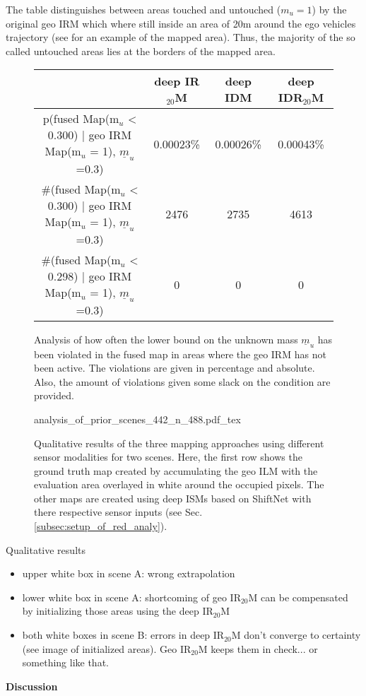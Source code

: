 The table distinguishes between areas touched and untouched ($m_u = 1$) by the original geo IRM which where still inside an area of 20m around the ego vehicles trajectory (see  for an example of the mapped area). Thus, the majority of the so called untouched areas lies at the borders of the mapped area. 
\begin{figure}[H]
	\begin{center}
	\begin{tabular}{c|ccc}
		& \scriptsize{deep IR$_{20}$M} & \scriptsize{deep IDM} & \scriptsize{deep IDR$_{20}$M}\\
		\hline
		\scriptsize{p(fused Map(m$_u$ < 0.300) | geo IRM Map(m$_u$ = 1), $\underline{m}_u$=0.3)} & \scriptsize{0.00023\%} & \scriptsize{0.00026\%} & \scriptsize{0.00043\%}\\
		\scriptsize{\#(fused Map(m$_u$ < 0.300) | geo IRM Map(m$_u$ = 1), $\underline{m}_u$=0.3)} & \scriptsize{2476} & \scriptsize{2735} & \scriptsize{4613}\\
		\scriptsize{\#(fused Map(m$_u$ < 0.298) | geo IRM Map(m$_u$ = 1), $\underline{m}_u$=0.3)} & \scriptsize{0} & \scriptsize{0} & \scriptsize{0}
	\end{tabular}
	\caption{\label{fig:prior_violations}Analysis of how often the lower bound on the unknown mass $\underline{m}_u$ has been violated in the fused map in areas where the geo IRM has not been active. The violations are given in percentage and absolute. Also, the amount of violations given some slack on the condition are provided.}
	\end{center}
\end{figure}

\begin{figure}[H]
	\begin{center}
		{analysis_of_prior_scenes_442_n_488.pdf_tex}
		\caption{\label{fig:qual_analysis_of_prior}Qualitative results of the three mapping approaches using different sensor modalities for two scenes. Here, the first row shows the ground truth map created by accumulating the geo ILM with the evaluation area overlayed in white around the occupied pixels. The other maps are created using deep ISMs based on ShiftNet with there respective sensor inputs (see Sec. \ref{subsec:setup_of_red_analy}).}
	\end{center}
\end{figure}
Qualitative results
\begin{itemize}
	\item upper white box in scene A: wrong extrapolation
	\item lower white box in scene A: shortcoming of geo IR$_{20}$M can be compensated by initializing those areas using the deep IR$_{20}$M
	\item both white boxes in scene B: errors in deep IR$_{20}$M don't converge to certainty (see image of initialized areas). Geo IR$_{20}$M keeps them in check... or something like that. 
\end{itemize}
\textbf{Discussion}
